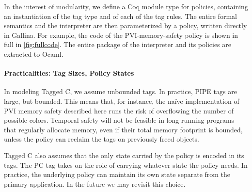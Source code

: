 \documentclass{llncs}
\begin{document}
In the interest of modularity, we define a Coq module type for policies, containing
an instantiation of the tag type and of each of the tag rules. The entire formal semantics
and the interpreter are then parameterized by a policy, written directly in Gallina.
For example, the code of the PVI-memory-safety policy is shown in full in \cref{fig:fullcode}.
The entire package of the interpreter and its policies are extracted to Ocaml.

\paragraph{Practicalities: Tag Sizes, Policy States}

In modeling Tagged C, we assume unbounded tags. In practice, PIPE tags are large, but
bounded. This means that, for instance, the na\"{i}ve implementation of PVI memory safety
described here runs the risk of overflowing the number of possible colors. 
Temporal safety will not be feasible in long-running programs that regularly allocate memory,
even if their total memory footprint is bounded, unless the policy can reclaim the tags
on previously freed objects. 

Tagged C also assumes that the only state carried by the policy is encoded in its tags.
The PC tag takes on the role of carrying whatever state the policy needs. In practice,
the underlying policy can maintain its own state separate from the primary application.
In the future we may revisit this choice.
\end{document}
